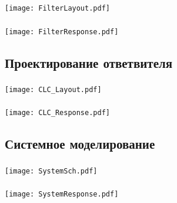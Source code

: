 \documentclass[c]{beamer}  %
\begin{document}
	\begin{frame}
		\frametitle{\insertsection}
		\framesubtitle{\insertsubsection}
		\centering
		\texttt{[image: FilterLayout.pdf]}
	\end{frame}

	\begin{frame}
		\frametitle{\insertsection}
		\framesubtitle{\insertsubsection}
		\centering
		\texttt{[image: FilterResponse.pdf]}
		
	\end{frame}

\subsection{Проектирование ответвителя}

	\begin{frame}
		\frametitle{\insertsection}
		\framesubtitle{\insertsubsection}
		\centering
		\texttt{[image: CLC\_Layout.pdf]}
	\end{frame}
	
	\begin{frame}
		\frametitle{\insertsection}
		\framesubtitle{\insertsubsection}
		\centering
		\texttt{[image: CLC\_Response.pdf]}
		
	\end{frame}

\subsection{Системное моделирование}

	\begin{frame}
		\frametitle{\insertsection}
		\framesubtitle{\insertsubsection}
		\centering
		\texttt{[image: SystemSch.pdf]}
		
	\end{frame}
	
	\begin{frame}
		\frametitle{\insertsection}
		\framesubtitle{\insertsubsection}
		\centering
		\texttt{[image: SystemResponse.pdf]}
		
	\end{frame}
\end{document}
